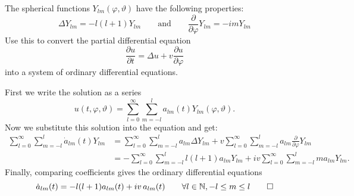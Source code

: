 The spherical functions $Y_{lm}(\varphi,\vartheta)$ have the following
properties:
\[
\Delta Y_{lm} = -l(l+1)Y_{lm}
\qquad
\text{and}
\qquad
\frac{\partial}{\partial\varphi}Y_{lm}
=
-im Y_{lm}
\]
Use this to convert the partial differential equation
\[
\frac{\partial u}{\partial t}
=
\Delta u + v \frac{\partial u}{\partial\varphi}
\]
into a system of ordinary differential equations.

\begin{loesung}
First we write the solution as a series 
\[
u(t,\varphi,\vartheta)
=
\sum_{l=0}^\infty \sum_{m=-l}^l
a_{lm}(t) Y_{lm}(\varphi,\vartheta).
\]
Now we substitute this solution into the equation and get:
\begin{align*}
\sum_{l=0}^\infty \sum_{m=-l}^l
\dot{a}_{lm}(t) Y_{lm}
&=
\sum_{l=0}^\infty \sum_{m=-l}^l
a_{lm}
\Delta Y_{lm}
+
v
\sum_{l=0}^\infty \sum_{m=-l}^l
a_{lm}
\frac{\partial}{\partial\varphi} Y_{lm}
\\
&=
-
\sum_{l=0}^\infty \sum_{m=-l}^l
l(l+1)
a_{lm}
Y_{lm}
+
i
v
\sum_{l=0}^\infty \sum_{m=-l}^l
m
a_{lm}
Y_{lm}.
\end{align*}
Finally, comparing coefficients gives the ordinary differential
equations
\[
\dot{a}_{lm}(t) = -l(l+1) a_{lm}(t) + iv\, a_{lm}(t)
\qquad
\forall l\in\mathbb{N}, -l\le m\le l
\qedhere
\]
\end{loesung}

